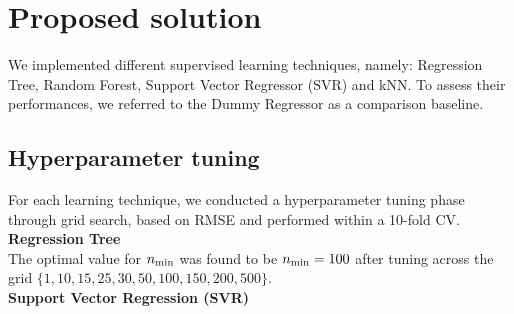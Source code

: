 \documentclass{article}
\newcommand{\nmin}{n_{\rm min}}
\begin{document}
\section{Proposed solution}
\label{sec:solution}
We implemented different supervised learning techniques, namely: Regression Tree, Random Forest, Support Vector Regressor (SVR) and kNN. To assess their performances, we referred to the Dummy Regressor as a comparison baseline.
\subsection{Hyperparameter tuning}
For each learning technique, we conducted a hyperparameter tuning phase through grid search, based on RMSE and performed within a 10-fold CV.\\[0.1cm]
\noindent
\textbf{Regression Tree} \\[0.1cm]
The optimal value for $\nmin$ was found to be $\nmin=100$ after tuning across the grid $\{1, 10, 15, 25, 30, 50, 100, 150, 200, 500\}$.\\[0.2cm]
\noindent
\textbf{Support Vector Regression (SVR)}\\[0.1cm]
\end{document}
